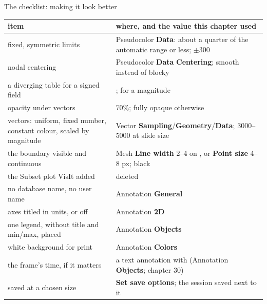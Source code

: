 \documentclass[aspectratio=169,11pt]{beamer}
\newcommand{\gui}[1]{\textsf{\textbf{#1}}}
\begin{document}
\begin{frame}{The checklist: making it look better}
\label{fr:checklist}
\footnotesize
\begin{tabular}{@{}L{0.34\textwidth}L{0.6\textwidth}@{}}
\toprule
item & where, and the value this chapter used \\
\midrule
fixed, symmetric limits & Pseudocolor \gui{Data}: about a quarter of the automatic range or less; $\pm300$ \\
nodal centering & Pseudocolor \gui{Data} \gui{Centering}; smooth instead of blocky \\
a diverging table for a signed field & ;  for a magnitude \\
opacity under vectors & 70\%; fully opaque otherwise \\
vectors: uniform, fixed number, constant colour, scaled by magnitude & Vector \gui{Sampling}/\gui{Geometry}/\gui{Data}; 3000--5000 at slide size \\
the boundary visible and continuous & Mesh \gui{Line width} 2--4 on , or \gui{Point size} 4--8 px; black \\
the Subset plot VisIt added & deleted \\
no database name, no user name & Annotation \gui{General} \\
axes titled in units, or off & Annotation \gui{2D} \\
one legend, without title and min/max, placed & Annotation \gui{Objects} \\
white background for print & Annotation \gui{Colors} \\
the frame's time, if it matters & a text annotation with  (Annotation \gui{Objects}; chapter 30) \\
saved at a chosen size & \gui{Set save options}; the session saved next to it \\
\bottomrule
\end{tabular}
\end{frame}
\end{document}
